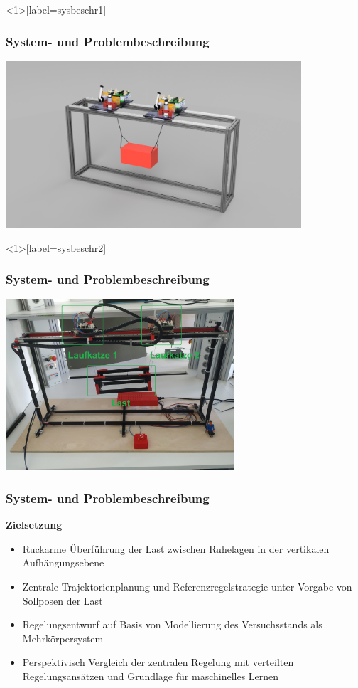 \documentclass[
	ngerman,
	10pt,				%
	aspectratio=169 	%
]{beamer}
\begin{document}
\begin{frame}<1>[label=sysbeschr1]
	\frametitle{System- { und Problembeschreibung}}
	\begin{center}
		\includegraphics[width=110mm]{images/Veritas_demo_CAD}
	\end{center}

\end{frame}

\begin{frame}<1>[label=sysbeschr2]
	\frametitle{System- { und Problembeschreibung}}
	\begin{center}
		\includegraphics[width=85mm]{images/real_gantry}
	\end{center}
	
\end{frame}

\begin{frame}[label=sysbeschr3]
	\frametitle{System- und Problembeschreibung}
	\textbf{Zielsetzung}
	\begin{itemize}
		\item Ruckarme Überführung der Last zwischen Ruhelagen in der vertikalen Aufhängungsebene
		\pause
		\item Zentrale Trajektorienplanung und Referenzregelstrategie unter Vorgabe von Sollposen der Last
		\pause
		\item Regelungsentwurf auf Basis von Modellierung des Versuchsstands als Mehrkörpersystem
		\pause  
		\item Perspektivisch Vergleich der zentralen Regelung mit verteilten Regelungsansätzen und Grundlage für maschinelles Lernen 
	\end{itemize}
\end{frame}
\end{document}
